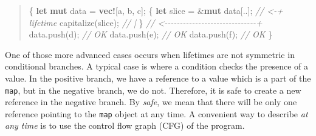 \documentclass[
  11pt,
  twoside,symmetric]{report}
\newenvironment{Shaded}{}{}
\newcommand{\CharTok}[1]{#1}
\newcommand{\CommentTok}[1]{\textit{#1}}
\newcommand{\KeywordTok}[1]{\textbf{#1}}
\newcommand{\NormalTok}[1]{#1}
\newcommand{\OperatorTok}[1]{#1}
\newcommand{\PreprocessorTok}[1]{\textbf{#1}}
\begin{document}
\begin{quote}
\begin{Shaded}
\begin{Highlighting}[]
\OperatorTok{\{}
    \KeywordTok{let} \KeywordTok{mut}\NormalTok{ data }\OperatorTok{=} \PreprocessorTok{vec!}\NormalTok{[}\CharTok{\textquotesingle{}a\textquotesingle{}}\OperatorTok{,} \CharTok{\textquotesingle{}b\textquotesingle{}}\OperatorTok{,} \CharTok{\textquotesingle{}c\textquotesingle{}}\NormalTok{]}\OperatorTok{;}
    \OperatorTok{\{}
        \KeywordTok{let}\NormalTok{ slice }\OperatorTok{=} \OperatorTok{\&}\KeywordTok{mut}\NormalTok{ data[}\OperatorTok{..}\NormalTok{]}\OperatorTok{;} \CommentTok{// \textless{}{-}+ \textquotesingle{}lifetime}
\NormalTok{        capitalize(slice)}\OperatorTok{;}         \CommentTok{//   |}
    \OperatorTok{\}} \CommentTok{// \textless{}{-}{-}{-}{-}{-}{-}{-}{-}{-}{-}{-}{-}{-}{-}{-}{-}{-}{-}{-}{-}{-}{-}{-}{-}{-}{-}{-}{-}{-}{-}+}
\NormalTok{    data}\OperatorTok{.}\NormalTok{push(}\CharTok{\textquotesingle{}d\textquotesingle{}}\NormalTok{)}\OperatorTok{;} \CommentTok{// OK}
\NormalTok{    data}\OperatorTok{.}\NormalTok{push(}\CharTok{\textquotesingle{}e\textquotesingle{}}\NormalTok{)}\OperatorTok{;} \CommentTok{// OK}
\NormalTok{    data}\OperatorTok{.}\NormalTok{push(}\CharTok{\textquotesingle{}f\textquotesingle{}}\NormalTok{)}\OperatorTok{;} \CommentTok{// OK}
\OperatorTok{\}}
\end{Highlighting}
\end{Shaded}
\end{quote}

One of those more advanced cases occurs when lifetimes are not symmetric
in conditional branches. A typical case is where a condition checks the
presence of a value. In the positive branch, we have a reference to a
value which is a part of the \texttt{map}, but in the negative branch,
we do not. Therefore, it is safe to create a new reference in the
negative branch. By \emph{safe}, we mean that there will be only one
reference pointing to the \texttt{map} object at any time. A convenient
way to describe \emph{at any time} is to use the control flow graph
(CFG) of the program.
\end{document}
